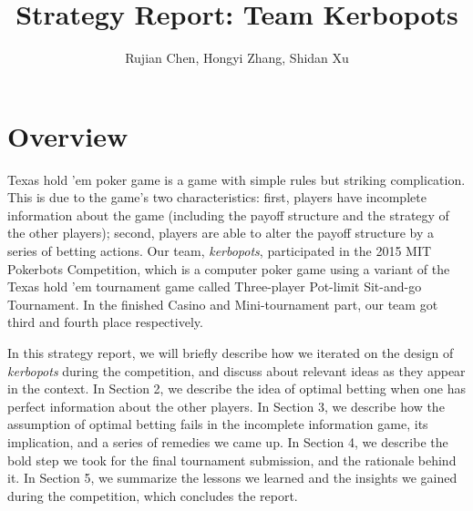 \documentclass[11pt, oneside]{article}   	%
\title{Strategy Report: Team Kerbopots}
\author{Rujian Chen, Hongyi Zhang, Shidan Xu}
\begin{document}
\maketitle
\section{Overview}
Texas hold 'em poker game is a game with simple rules but striking complication. This is due to the game's two characteristics: first, players have incomplete information about the game (including the payoff structure and the strategy of the other players); second, players are able to alter the payoff structure by a series of betting actions. Our team, \emph{kerbopots}, participated in the 2015 MIT Pokerbots Competition, which is a computer poker game using a variant of the Texas hold 'em tournament game called Three-player Pot-limit Sit-and-go Tournament. In the finished Casino and Mini-tournament part, our team got third and fourth place respectively.

In this strategy report, we will briefly describe how we iterated on the design of \emph{kerbopots} during the competition, and discuss about relevant ideas as they appear in the context. In Section 2, we describe the idea of optimal betting when one has perfect information about the other players. In Section 3, we describe how the assumption of optimal betting fails in the incomplete information game, its implication, and a series of remedies we came up. In Section 4, we describe the bold step we took for the final tournament submission, and the rationale behind it. In Section 5, we summarize the lessons we learned and the insights we gained during the competition, which concludes the report.
\end{document}

